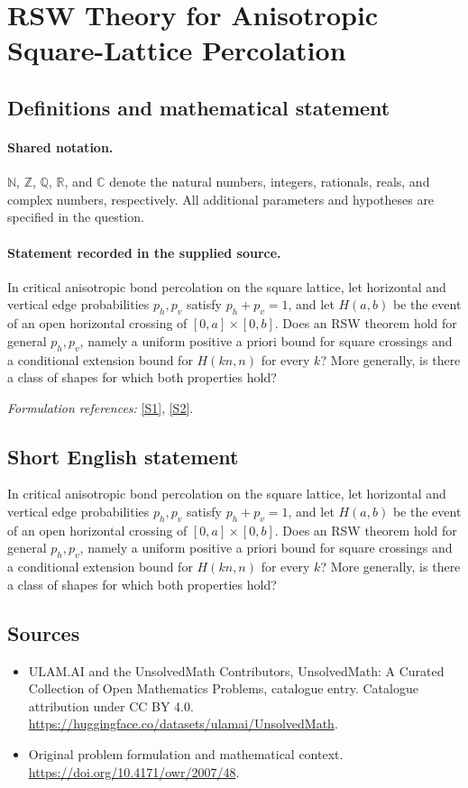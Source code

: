 \documentclass[11pt]{article}
\newcommand{\sref}[2]{\hyperlink{source:#1:#2}{[S#2]}}
\begin{document}
\section{RSW Theory for Anisotropic Square-Lattice Percolation}\label{statement}

\subsection{Definitions and mathematical statement}

\paragraph{Shared notation.}$\mathbb N$, $\mathbb Z$, $\mathbb Q$, $\mathbb R$, and $\mathbb C$ denote the natural numbers, integers, rationals, reals, and complex numbers, respectively. All additional parameters and hypotheses are specified in the question.


\paragraph{Statement recorded in the supplied source.}
In critical anisotropic bond percolation on the square lattice, let horizontal and vertical edge probabilities $p_h,p_v$ satisfy $p_h+p_v=1$, and let $H(a,b)$ be the event of an open horizontal crossing of $[0,a]\times[0,b]$. Does an RSW theorem hold for general $p_h,p_v$, namely a uniform positive a priori bound for square crossings and a conditional extension bound for $H(kn,n)$ for every $k$? More generally, is there a class of shapes for which both properties hold?
\par\smallskip\textit{Formulation references:} \sref{statement}{1}, \sref{statement}{2}.
\subsection{Short English statement}
In critical anisotropic bond percolation on the square lattice, let horizontal and vertical edge probabilities $p_h,p_v$ satisfy $p_h+p_v=1$, and let $H(a,b)$ be the event of an open horizontal crossing of $[0,a]\times[0,b]$. Does an RSW theorem hold for general $p_h,p_v$, namely a uniform positive a priori bound for square crossings and a conditional extension bound for $H(kn,n)$ for every $k$? More generally, is there a class of shapes for which both properties hold?
\subsection{Sources}
\begin{itemize}
\item[\hypertarget{source:statement:1}{S1}] ULAM.AI and the UnsolvedMath Contributors, UnsolvedMath: A Curated Collection of Open Mathematics Problems, catalogue entry. Catalogue attribution under CC BY 4.0.
\url{https://huggingface.co/datasets/ulamai/UnsolvedMath}.
\item[\hypertarget{source:statement:2}{S2}] Original problem formulation and mathematical context.
\url{https://doi.org/10.4171/owr/2007/48}.
\end{itemize}
\label{end:statement}
\end{document}
